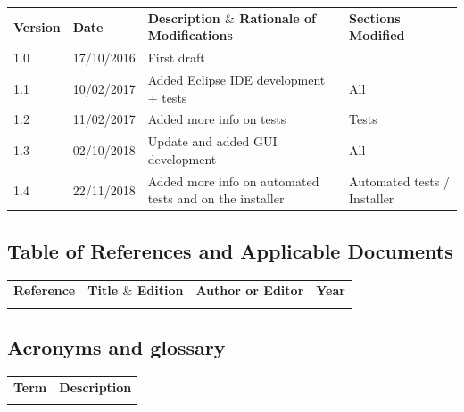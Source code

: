 \documentclass[12pt]{article}
\begin{document}
\begin{table}[H]
\large
\centering
\begin{adjustbox}{width=\textwidth}
\begin{tabular}{ |p{1.5cm}|p{2.5cm}|p{9.0cm}|p{3.0cm}| }
\hhline{----}
\textbf{Version} & \textbf{Date} & \textbf{Description  $  \&  $  Rationale of
Modifications} & \textbf{Sections Modified} \\
\hhline{----}
1.0 & 17/10/2016 & First draft &  \\ 
1.1 & 10/02/2017 & Added Eclipse IDE development + tests & All \\ 
1.2 & 11/02/2017 & Added more info on tests & Tests \\ 
1.3 & 02/10/2018 & Update and added GUI development & All\\
1.4 & 22/11/2018 & Added more info on automated tests and on the installer & Automated tests / Installer \\
\hline
\end{tabular}
\end{adjustbox}
\end{table}

\subsection{Table of References and Applicable Documents}

\begin{table}[H]
\large
\centering
\begin{adjustbox}{width=\textwidth}
\begin{tabular}{ |p{2.66in}|p{2.66in}|p{0.95in}|p{0.43in}| }
\hhline{----}
\textbf{Reference} & \textbf{Title  $  \&  $  Edition} & \textbf{Author or
Editor} & \textbf{Year}
\\
\hhline{----}
 &  &  &  \\ 
\hline
\end{tabular}
\end{adjustbox}
\end{table}

\subsection{Acronyms and glossary}

\begin{table}[H]
\large
\centering
\begin{adjustbox}{width=\textwidth}
\begin{tabular}{ |p{1.24in}|p{5.45in}| }
\hhline{--}
\textbf{Term} & \textbf{Description} \\ 
\hhline{--}
 &  \\ 
\hline
\end{tabular}
\end{adjustbox}
\end{table}
\end{document}
